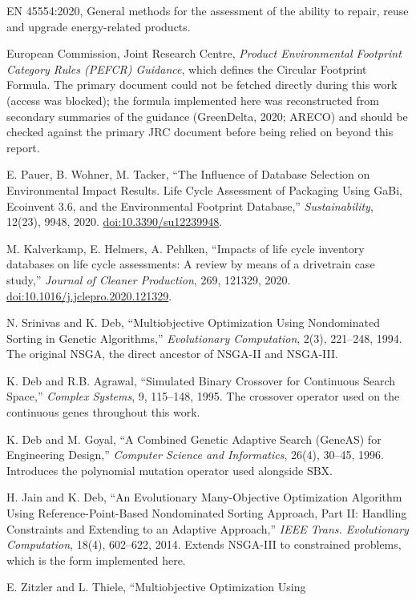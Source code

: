 \documentclass[11pt,a4paper]{article}
\begin{document}
\begin{enumerate}[label={[\arabic*]}]
\item EN 45554:2020, General methods for the assessment of the ability to
repair, reuse and upgrade energy-related products.
\item European Commission, Joint Research Centre, \emph{Product
Environmental Footprint Category Rules (PEFCR) Guidance}, which defines the
Circular Footprint Formula. The primary document could not be fetched
directly during this work (access was blocked); the formula implemented here
was reconstructed from secondary summaries of the guidance (GreenDelta,
2020; ARECO) and should be checked against the primary JRC document before
being relied on beyond this report.
\item E. Pauer, B. Wohner, M. Tacker, ``The Influence of Database Selection
on Environmental Impact Results. Life Cycle Assessment of Packaging Using
GaBi, Ecoinvent 3.6, and the Environmental Footprint Database,''
\emph{Sustainability}, 12(23), 9948, 2020.
\href{https://doi.org/10.3390/su12239948}{doi:10.3390/su12239948}.
\item M. Kalverkamp, E. Helmers, A. Pehlken, ``Impacts of life cycle
inventory databases on life cycle assessments: A review by means of a
drivetrain case study,'' \emph{Journal of Cleaner Production}, 269, 121329,
2020. \href{https://doi.org/10.1016/j.jclepro.2020.121329}{doi:10.1016/j.jclepro.2020.121329}.
\item N. Srinivas and K. Deb, ``Multiobjective Optimization Using
Nondominated Sorting in Genetic Algorithms,'' \emph{Evolutionary
Computation}, 2(3), 221--248, 1994. The original NSGA, the direct ancestor
of NSGA-II and NSGA-III.
\item K. Deb and R.B. Agrawal, ``Simulated Binary Crossover for Continuous
Search Space,'' \emph{Complex Systems}, 9, 115--148, 1995. The crossover
operator used on the continuous genes throughout this work.
\item K. Deb and M. Goyal, ``A Combined Genetic Adaptive Search (GeneAS) for
Engineering Design,'' \emph{Computer Science and Informatics}, 26(4),
30--45, 1996. Introduces the polynomial mutation operator used alongside SBX.
\item H. Jain and K. Deb, ``An Evolutionary Many-Objective Optimization
Algorithm Using Reference-Point-Based Nondominated Sorting Approach, Part II:
Handling Constraints and Extending to an Adaptive Approach,'' \emph{IEEE
Trans. Evolutionary Computation}, 18(4), 602--622, 2014. Extends NSGA-III to
constrained problems, which is the form implemented here.
\item E. Zitzler and L. Thiele, ``Multiobjective Optimization Using

\end{enumerate}
\end{document}
